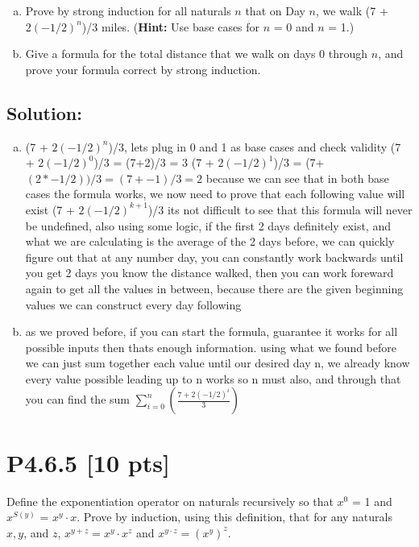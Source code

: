 \documentclass[12pt]{article}
\begin{document}
\begin{enumerate}[(a)]
    \item Prove by strong induction for all naturals $n$ that on Day $n$, we walk (7 + $2(-1/2)^n$)/3 miles. (\textbf{Hint:} Use base cases for $n$ = 0 and $n$ = 1.)

    \item Give a formula for the total distance that we walk on days 0 through $n$, and prove your formula correct by strong induction.

\end{enumerate}

\subsection*{\textbf{Solution:}}
\begin{enumerate}[(a)]
    \item (7 + $2(-1/2)^n$)/3, lets plug in 0 and 1 as base cases and check validity\newline
    (7 + $2(-1/2)^0$)/3 = (7+2)/3 = 3\newline
    (7 + $2(-1/2)^1$)/3 = (7+$(2*-1/2))/3 = (7+-1)/3 = 2$
    because we can see that in both base cases the formula works, we now need to prove that each following value will exist
    (7 + $2(-1/2)^{k+1}$)/3 its not difficult to see that this formula will never be undefined, also using some logic, if the first 2 days definitely exist, and what we are calculating is the average of the 2 days before, we can quickly figure out that at any number day, you can constantly work backwards until you get 2 days you know the distance walked, then you can work foreward again to get all the values in between, because there are the given beginning values we can construct every day following
    \item 
    as we proved before, if you can start the formula, guarantee it works for all possible inputs then thats enough information. using what we found before we can just sum together each value until our desired day n, we already know every value possible leading up to n works so n must also, and through that you can find the sum
    $\sum_{i=0}^{n} \left(\frac{7 + 2(-1/2)^i}{3}\right)$

\end{enumerate}


\newpage
\section*{\textbf{P4.6.5} [10 pts]}
Define the exponentiation operator on naturals recursively so that $x^0$ = 1 and $x^{S(y)}$ = $x^y \cdot x$. Prove by induction, using this definition, that for any naturals $x, y$, and $z$, $x^{y+z} = x^y \cdot x^z$ and $x^{y \cdot z} = (x^y)^z$.
\end{document}
